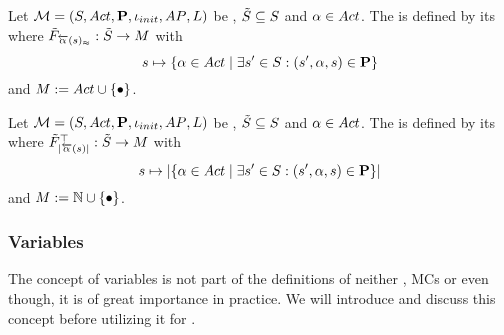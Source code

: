 \documentclass[preview]{standalone}
\begin{document}
\begin{definition}
	Let ${{{\mathcal{M}}}} = {{({S}, {Act}, {\textbf{P}}, {\iota_{init}}, {AP}, {L})}}$ be \achgphN, ${\tilde{{S}}} \subseteq {S}$ and ${\alpha} \in {Act}$. The \viewN \viewweakinactident is defined by its \grpfctN \gfctweakinactident where ${{\tilde{F}_{{{\overleftarrow{{\alpha}}}({s})_\approx}}}} : {\tilde{{S}}} \to {\ensuremath{{M}}}$ with
	\[
	{s} \mapsto \{{\alpha} \in {Act} \mid \exists {s}' \in {S} : ({s}', {\alpha}, {s}) \in {\ensuremath{{\textbf{P}}}}\} 	
	\]
	and $\imggrp := \actions\cup \remset$.
\end{definition}

\begin{definition}
	Let ${{{\mathcal{M}}}} = {{({S}, {Act}, {\textbf{P}}, {\iota_{init}}, {AP}, {L})}}$ be \achgphN, ${\tilde{{S}}} \subseteq {S}$ and ${\alpha} \in {Act}$. The \viewN \viewinactsetsize is defined by its \grpfctN \gfctinactsetsize where ${{\tilde{F}_{{|{\overleftarrow{{\alpha}}}({s})|}}}^{\top}} : {\tilde{{S}}} \to {\ensuremath{{M}}}$ with
	\[
	{s} \mapsto |\{{\alpha} \in {Act} \mid \exists {s}' \in {S} : ({s}', {\alpha}, {s}) \in {\ensuremath{{\textbf{P}}}}\}|
	\]
	and $\imggrp := \natnums \cup \remset$.
\end{definition}

\subsubsection{Variables}
The concept of variables is not part of the definitions of neither \tsN, MCs or \mdpsN even though, it is of great importance in practice. We will introduce and discuss this concept before utilizing it for \viewsN.
\end{document}
